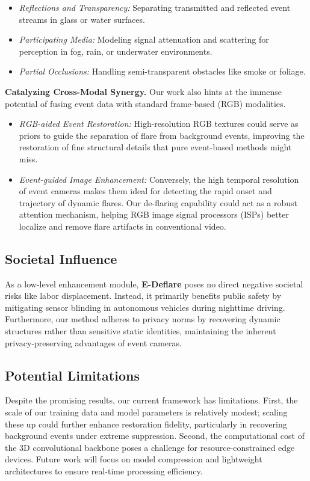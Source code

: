 \begin{itemize}
    \item \emph{Reflections and Transparency:} Separating transmitted and reflected event streams in glass or water surfaces.
    \item \emph{Participating Media:} Modeling signal attenuation and scattering for perception in fog, rain, or underwater environments.
    \item \emph{Partial Occlusions:} Handling semi-transparent obstacles like smoke or foliage.
\end{itemize}

\noindent\textbf{Catalyzing Cross-Modal Synergy.}
Our work also hints at the immense potential of fusing event data with standard frame-based (RGB) modalities.

\begin{itemize}
    \item \emph{RGB-aided Event Restoration:} High-resolution RGB textures could serve as priors to guide the separation of flare from background events, improving the restoration of fine structural details that pure event-based methods might miss.
    \item \emph{Event-guided Image Enhancement:} Conversely, the high temporal resolution of event cameras makes them ideal for detecting the rapid onset and trajectory of dynamic flares. Our de-flaring capability could act as a robust attention mechanism, helping RGB image signal processors (ISPs) better localize and remove flare artifacts in conventional video.
\end{itemize}

\subsection{Societal Influence}
As a low-level enhancement module, \textbf{E-Deflare} poses no direct negative societal risks like labor displacement. Instead, it primarily benefits public safety by mitigating sensor blinding in autonomous vehicles during nighttime driving. Furthermore, our method adheres to privacy norms by recovering dynamic structures rather than sensitive static identities, maintaining the inherent privacy-preserving advantages of event cameras.

\subsection{Potential Limitations}

Despite the promising results, our current framework has limitations. First, the scale of our training data and model parameters is relatively modest; scaling these up could further enhance restoration fidelity, particularly in recovering background events under extreme suppression. Second, the computational cost of the 3D convolutional backbone poses a challenge for resource-constrained edge devices. Future work will focus on model compression and lightweight architectures to ensure real-time processing efficiency.


